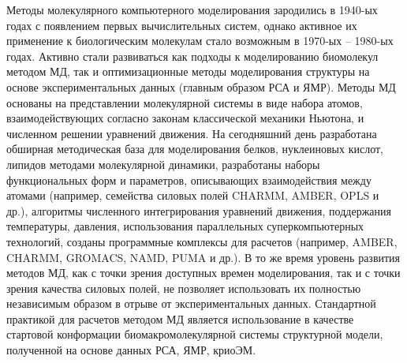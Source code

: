 Методы молекулярного компьютерного моделирования зародились в 1940-ых годах с появлением первых вычислительных систем, однако активное их применение к биологическим молекулам стало возможным в 1970-ых -- 1980-ых годах. Активно стали развиваться как подходы к моделированию биомолекул методом МД, так и оптимизационные методы моделирования структуры на основе экспериментальных данных (главным образом РСА и ЯМР). Методы МД основаны на представлении молекулярной системы в виде набора атомов, взаимодействующих согласно законам классической механики Ньютона, и численном решении уравнений движения. На сегодняшний день разработана обширная методическая база для моделирования белков, нуклеиновых кислот, липидов методами молекулярной динамики, разработаны наборы функциональных форм и параметров, описывающих взаимодействия между атомами (например, семейства силовых полей CHARMM, AMBER, OPLS и др.), алгоритмы численного интегрирования уравнений движения, поддержания температуры, давления, использования параллельных суперкомпьютерных технологий, созданы программные комплексы для расчетов (например, AMBER, CHARMM, GROMACS, NAMD, PUMA и др.).
В то же время уровень развития методов МД, как с точки зрения доступных времен моделирования, так и с точки зрения качества силовых полей, не позволяет использовать их полностью независимым образом в отрыве от экспериментальных данных. Стандартной практикой для расчетов методом МД является использование в качестве стартовой конформации биомакромолекулярной системы структурной модели, полученной на основе данных РСА, ЯМР, криоЭМ. 

